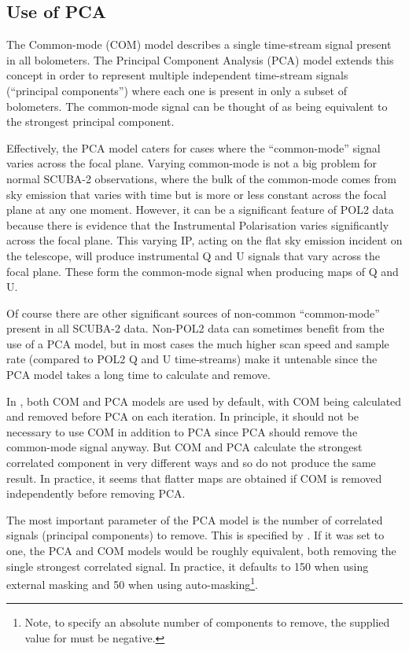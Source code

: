 \documentclass[twoside,11pt]{starlink}
\begin{document}
\subsection{Use of PCA}
The Common-mode (COM) model describes a single time-stream signal present
in all bolometers. The Principal Component Analysis (PCA) model extends
this concept in order to represent multiple independent time-stream
signals (``principal components'') where each one is present in only a
subset of bolometers. The common-mode signal can be thought of as being
equivalent to the strongest principal component.

Effectively, the PCA model caters for cases where the ``common-mode''
signal varies across the focal plane. Varying common-mode is not a big
problem for normal SCUBA-2 observations, where the bulk of the
common-mode comes from sky emission that varies with time but is more or
less constant across the focal plane at any one moment. However, it can be
a significant feature of POL2 data because there is evidence that the
Instrumental Polarisation varies significantly across the focal plane.
This varying IP, acting on the flat sky emission incident on the telescope,
will produce instrumental Q and U signals that vary across the focal
plane. These form the common-mode signal when producing maps of Q and U.

Of course there are other significant sources of non-common ``common-mode''
present in all SCUBA-2 data. Non-POL2 data can sometimes benefit from the
use of a PCA model, but in most cases the much higher scan speed and
sample rate (compared to POL2 Q and U time-streams) make it untenable
since the PCA model takes a long time to calculate and remove.

In \ptmap, both COM and PCA models are used by default, with COM being
calculated and removed before PCA on each iteration. In principle, it
should not be necessary to use COM in addition to PCA since PCA should
remove the common-mode signal anyway. But COM and PCA calculate the
strongest correlated component in very different ways and so do not
produce the same result. In practice, it seems that flatter maps are
obtained if COM is removed independently before removing PCA.

The most important parameter of the PCA model is the number of correlated
signals (principal components) to remove. This is specified by .
If it was set to one, the PCA and COM models would be roughly equivalent,
both removing the single strongest correlated signal. In practice, it
defaults to 150 when using external masking and 50 when using
auto-masking\footnote{Note, to specify an absolute number of components
to remove, the supplied value for  must be negative.}.
\end{document}
